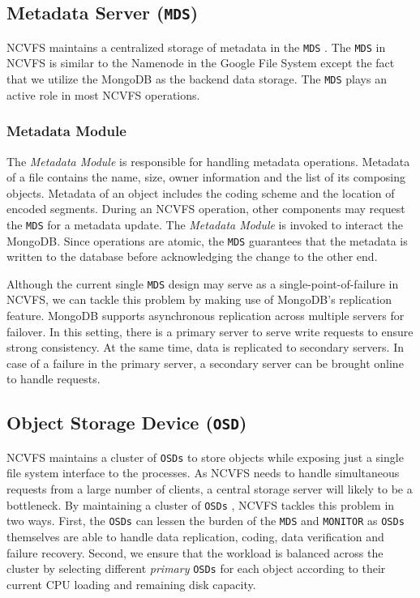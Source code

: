 \documentclass{article}
\def\osds{\texttt{OSDs} }
\def\mds{\texttt{MDS} }
\def\monitor{\texttt{MONITOR} }
\begin{document}
\subsection{Metadata Server (\texttt{MDS})}

NCVFS maintains a centralized storage of metadata in the \mds. The \mds in NCVFS is similar to the 
Namenode in the Google File System except the fact that we utilize the MongoDB as the backend data 
storage. The \mds plays an active role in most NCVFS operations.

\subsubsection{Metadata Module}

The \textit{Metadata Module} is responsible for handling metadata operations. 
Metadata of a file contains the name, size, owner information and the list of its
composing objects. Metadata of an object includes the coding scheme and the
location of encoded segments. During an NCVFS operation, other components
may request the \mds for a metadata update. The \textit{Metadata Module} is invoked
to interact the MongoDB. Since operations are atomic, the \mds guarantees that
the metadata is written to the database before acknowledging the change to the
other end.

Although the current single \mds design may serve as a single-point-of-failure in NCVFS, we can
tackle this problem by making use of MongoDB's replication feature. MongoDB supports asynchronous 
replication across multiple servers for failover. In this setting, there is a primary server 
to serve write requests to ensure strong consistency. At the same time, data is replicated to
secondary servers. In case of a failure in the primary server, a secondary server can be brought 
online to handle requests.

\subsection{Object Storage Device (\texttt{OSD})}

NCVFS maintains a cluster of \osds to store objects while exposing just a single
file system interface to the processes. As NCVFS needs to handle simultaneous
requests from a large number of clients, a central storage server will likely to
be
a bottleneck. By maintaining a cluster of \osds , NCVFS tackles this problem
in two ways. First, the \osds can lessen the burden of the \mds and \monitor as
\osds themselves are able to handle data replication, coding, data verification
and failure recovery. Second, we ensure that the workload is balanced across the
cluster by selecting different \textit{primary} \osds for each object according to their
current CPU loading and remaining disk capacity.
\end{document}
